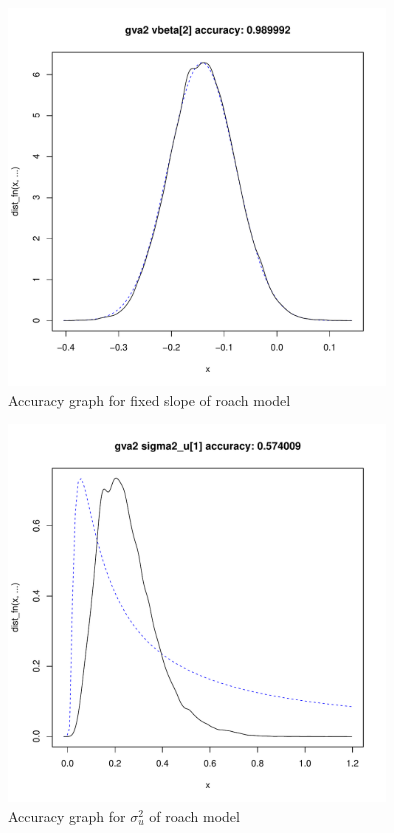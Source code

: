 \documentclass{article}[12pt]
\begin{document}
\begin{figure}
\caption{Accuracy graph for fixed slope of roach model}
\label{fig:accuracy_roach_slope}
\includegraphics[width=100mm, height=100mm]{code/results/2_accuracy_plots_application_gva2.pdf}
\end{figure}

\begin{figure}
\caption{Accuracy graph for $\sigma_u^2$ of roach model}
\label{fig:accuracy_roach_sigmau2}
\includegraphics[width=100mm, height=100mm]{code/results/16_accuracy_plots_application_gva2.pdf}
\end{figure}
\end{document}
